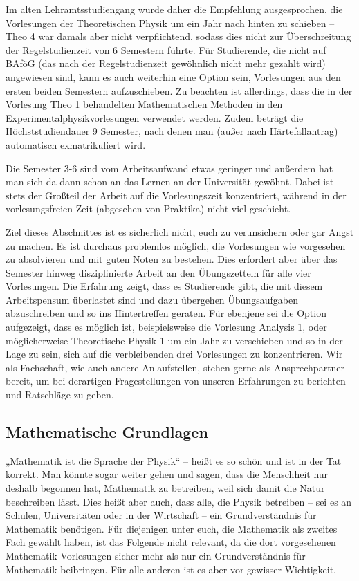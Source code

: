 Im alten Lehramtsstudiengang wurde daher die Empfehlung ausgesprochen, die Vorlesungen der Theoretischen Physik um ein Jahr nach hinten zu schieben -- Theo 4 war damals aber nicht verpflichtend, sodass dies nicht zur Überschreitung der Regelstudienzeit von 6 Semestern führte. Für Studierende, die nicht auf BAföG (das nach der Regelstudienzeit gewöhnlich nicht mehr gezahlt wird) angewiesen sind, kann es auch weiterhin eine Option sein, Vorlesungen aus den ersten beiden Semestern aufzuschieben. Zu beachten ist allerdings, dass die in der Vorlesung Theo 1 behandelten Mathematischen Methoden in den Experimentalphysikvorlesungen verwendet werden. Zudem beträgt die Höchststudiendauer 9 Semester, nach denen man (außer nach Härtefallantrag) automatisch exmatrikuliert wird.

Die Semester 3-6 sind vom Arbeitsaufwand etwas geringer und außerdem hat man sich da dann schon an das Lernen an der Universität gewöhnt. Dabei ist stets der Großteil der Arbeit auf die Vorlesungszeit konzentriert, während in der vorlesungsfreien Zeit (abgesehen von Praktika) nicht viel geschieht.

Ziel dieses Abschnittes ist es sicherlich nicht, euch zu verunsichern oder gar Angst zu machen. Es ist durchaus problemlos möglich, die Vorlesungen wie vorgesehen zu absolvieren und mit guten Noten zu bestehen. Dies erfordert aber über das Semester hinweg disziplinierte Arbeit an den Übungszetteln für alle vier Vorlesungen. Die Erfahrung zeigt, dass es Studierende gibt, die mit diesem Arbeitspensum überlastet sind und dazu übergehen Übungsaufgaben abzuschreiben und so ins Hintertreffen geraten. Für ebenjene sei die Option aufgezeigt, dass es möglich ist, beispielsweise die Vorlesung Analysis 1, oder möglicherweise Theoretische Physik 1 um ein Jahr zu verschieben und so in der Lage zu sein, sich auf die verbleibenden drei Vorlesungen zu konzentrieren. Wir als Fachschaft, wie auch andere Anlaufstellen, stehen gerne als Ansprechpartner bereit, um bei derartigen Fragestellungen von unseren Erfahrungen zu berichten und Ratschläge zu geben.

\subsection{Mathematische Grundlagen}

„Mathematik ist die Sprache der Physik“ -- heißt es so schön und ist in der Tat korrekt. Man könnte sogar weiter gehen und sagen, dass die Menschheit nur deshalb begonnen hat, Mathematik zu betreiben, weil sich damit die Natur beschreiben lässt. Dies heißt aber auch, dass alle, die Physik betreiben -- sei es an Schulen, Universitäten oder in der Wirtschaft -- ein Grundverständnis für Mathematik benötigen. Für diejenigen unter euch, die Mathematik als zweites Fach gewählt haben, ist das Folgende nicht relevant, da die dort vorgesehenen Mathematik-Vorlesungen sicher mehr als nur ein Grundverständnis für Mathematik beibringen. Für alle anderen ist es aber vor gewisser Wichtigkeit.


